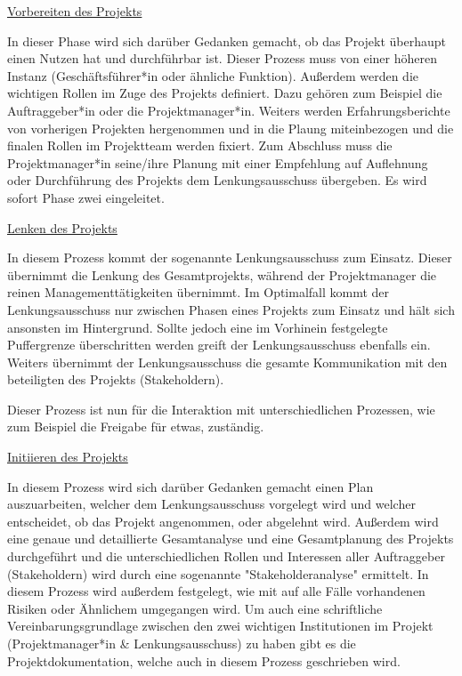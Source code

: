 \underline{Vorbereiten des Projekts}

In dieser Phase wird sich darüber Gedanken gemacht, ob das Projekt überhaupt einen Nutzen hat und durchführbar ist. Dieser Prozess muss von einer höheren Instanz (Geschäftsführer*in oder ähnliche Funktion). Außerdem werden die wichtigen Rollen im Zuge des Projekts definiert. Dazu gehören zum Beispiel die Auftraggeber*in oder die Projektmanager*in. Weiters werden Erfahrungsberichte von vorherigen Projekten hergenommen und in die Plaung miteinbezogen und die finalen Rollen im Projektteam werden fixiert. Zum Abschluss muss die Projektmanager*in seine/ihre Planung mit einer Empfehlung auf Auflehnung oder Durchführung des Projekts dem Lenkungsausschuss übergeben. Es wird sofort Phase zwei eingeleitet. \cite{Prince2}

\underline{Lenken des Projekts}

In diesem Prozess kommt der sogenannte Lenkungsausschuss zum Einsatz. Dieser übernimmt die Lenkung des Gesamtprojekts, während der Projektmanager die reinen Managementtätigkeiten übernimmt. Im Optimalfall kommt der Lenkungsausschuss nur zwischen Phasen eines Projekts zum Einsatz und hält sich ansonsten im Hintergrund. Sollte jedoch eine im Vorhinein festgelegte Puffergrenze überschritten werden greift der Lenkungsausschuss ebenfalls ein. Weiters übernimmt der Lenkungsausschuss die gesamte Kommunikation mit den beteiligten des Projekts (Stakeholdern). \cite{Prince2}

Dieser Prozess ist nun für die Interaktion mit unterschiedlichen Prozessen, wie zum Beispiel die Freigabe für etwas, zuständig. \cite{Prince2}

\underline{Initiieren des Projekts}

In diesem Prozess wird sich darüber Gedanken gemacht einen Plan auszuarbeiten, welcher dem Lenkungsausschuss vorgelegt wird und welcher entscheidet, ob das Projekt angenommen, oder abgelehnt wird. Außerdem wird eine genaue und detaillierte Gesamtanalyse und eine Gesamtplanung des Projekts durchgeführt und die unterschiedlichen Rollen und Interessen aller Auftraggeber (Stakeholdern) wird durch eine sogenannte "Stakeholderanalyse" ermittelt. In diesem Prozess wird außerdem festgelegt, wie mit auf alle Fälle vorhandenen Risiken oder Ähnlichem umgegangen wird. Um auch eine schriftliche Vereinbarungsgrundlage zwischen den zwei wichtigen Institutionen im Projekt (Projektmanager*in \& Lenkungsausschuss) zu haben gibt es die Projektdokumentation, welche auch in diesem Prozess geschrieben wird. \cite{Prince2} \cite{Stakeholder}

